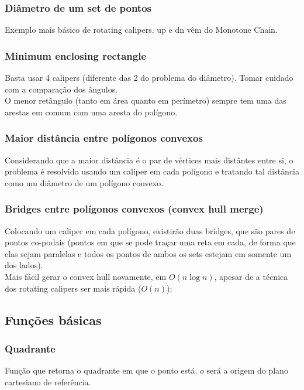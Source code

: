 \subsubsection{Di\^{a}metro de um set de pontos}
Exemplo mais b\'{a}sico de rotating calipers. up e dn v\^{e}m do Monotone Chain.
\divisor

\subsubsection{Minimum enclosing rectangle}
Basta usar 4 calipers (diferente das 2 do problema do di\^{a}metro). Tomar cuidado com a compara\c{c}\~{a}o dos \^{a}ngulos.
\\ O menor ret\^{a}ngulo (tanto em \'{a}rea quanto em per\'{i}metro) sempre tem uma das arestas em comum com uma aresta do pol\'{i}gono.
\divisor

\subsubsection{Maior dist\^{a}ncia entre pol\'{i}gonos convexos}
Considerando que a maior dist\^{a}ncia \'{e} o par de v\'{e}rtices mais dist\^{a}ntes entre si, o problema \'{e}  resolvido usando um caliper em cada pol\'{i}gono e tratando tal dist\^{a}ncia como um di\^{a}metro de um pol\'{i}gono convexo.
\divisor

\subsubsection{Bridges entre pol\'{i}gonos convexos (convex hull merge)}
Colocando um caliper em cada pol\'{i}gono, existir\~{a}o duas bridges, que s\~{a}o pares de pontos co-podais (pontos em que se pode tra\c{c}ar uma reta em cada, de forma que elas sejam paralelas e todos os pontos de ambos os sets estejam em somente um dos lados).
\\ Mais f\'{a}cil gerar o convex hull novamente, em $O(n \log{n})$, apesar de a t\'{e}cnica dos rotating calipers ser mais r\'{a}pida ($O(n)$);
\divisor

\subsection{Fun\c{c}\~{o}es b\'{a}sicas}
\subsubsection{Quadrante}
Fun\c{c}\~{a}o que retorna o quadrante em que o ponto est\'{a}. $o$ ser\'{a} a origem do plano cartesiano de refer\^{e}ncia.
\divisor

